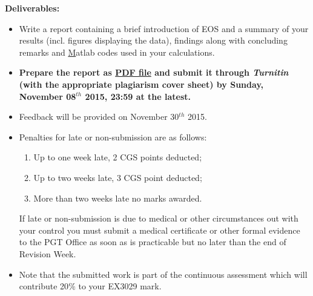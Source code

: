 \documentclass[12pts,a4paper,amsmath,amssymb,floatfix]{article}%
\begin{document}
{\bf Deliverables:}
\begin{itemize}
\item Write a report containing a brief introduction of EOS and a summary of your results (incl. figures displaying the data), findings along with concluding remarks and {\underline Matlab codes} used in your calculations. 
%
\item {\bf Prepare the report as \underline{PDF file} and submit it through {\it Turnitin} (with the appropriate plagiarism cover sheet) by Sunday, November 08$^{th}$ 2015, 23:59 at the latest.}
%
\item Feedback will be provided on November 30$^{th}$ 2015.
%
\item Penalties for late or non-submission are as follows:
\begin{enumerate}%
\item Up to one week late, 2 CGS points deducted;
\item Up to two weeks late, 3 CGS point deducted;
\item More than two weeks late no marks awarded.
\end{enumerate}
If late or non-submission is due to medical or other circumstances out with your control you must submit a medical certificate or other formal evidence to the PGT Office as soon as is practicable but no later than the end of Revision Week.


\item Note that the submitted work is part of the continuous assessment which will contribute 20$\%$ to your EX3029 mark.

\end{itemize}



\clearpage

%
\end{document}
